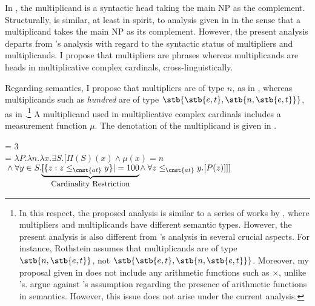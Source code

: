 \documentclass[output=paper]{langscibook}
\begin{document}
In , the multiplicand is a syntactic head taking the main NP as the complement. Structurally,  is similar, at least in spirit, to  analysis given in  in the sense that a multiplicand takes the main NP as its complement. However, the present analysis departs from \citeauthor{IoninMatushansky2018}'s analysis with regard to the syntactic status of multipliers and multiplicands. I propose that multipliers are phrases whereas multiplicands are heads in multiplicative complex cardinals, cross-linguistically.

Regarding semantics, I propose that multipliers are of type $n$, as in , whereas multiplicands such as \textit{hundred} are of type $\stb{\stb{e,t},\stb{n,\stb{e,t}}}$, as in .\footnote{In this respect, the proposed analysis is similar to a series of works by \citet{Rothstein2013, Rothstein2017}, where multipliers and multiplicands have different semantic types. However, the present analysis is also different from \citeauthor{Rothstein2013}'s analysis in several crucial aspects. For instance, Rothstein assumes that multiplicands are of type $\stb{n,\stb{e,t}}$, not $\stb{\stb{e,t},\stb{n,\stb{e,t}}}$. Moreover, my proposal given in  does not include any arithmetic functions such as $\times$, unlike \citeauthor{Rothstein2013}'s. \citeauthor{IoninMatushansky2018} argue against \citeauthor{Rothstein2013}'s assumption regarding the presence of arithmetic functions in semantics. However, this issue does not arise under the current analysis.} A multiplicand used in multiplicative complex cardinals includes a measurement function $\mu$. The denotation of the multiplicand  is given in . 

\ea
\ea\label{tat:mulp}  = 3
\ex\label{tat:mulc} \\
= $\lambda P.\lambda n.\lambda x.\exists S.[\Pi(S)(x) \wedge \mu(x)=n$\\ \hspace*{\fill}${}\wedge \forall y \in S.[\hspace{-3pt}
\underbrace{\vert\{z: z\leq_{\cnst{at}}y\}\vert = 100}_{\text{\small Cardinality Restriction}}\hspace{-3pt}
{}\wedge\forall z\leq_{\cnst{at}}y.[P(z)]]]$
\z
\z
\end{document}
